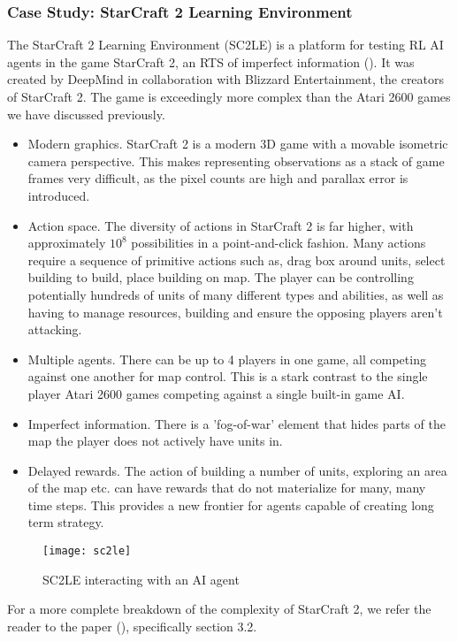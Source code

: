 \subsubsection{Case Study: StarCraft 2 Learning Environment}
The StarCraft 2 Learning Environment (SC2LE) is a platform for testing RL AI agents in the game StarCraft 2, an RTS of imperfect information (\cite{starcraft}). It was created by DeepMind in collaboration with Blizzard Entertainment, the creators of StarCraft 2. The game is exceedingly more complex than the Atari 2600 games we have discussed previously.
\begin{itemize}
    \item Modern graphics. StarCraft 2 is a modern 3D game with a movable isometric camera perspective. This makes representing observations as a stack of game frames very difficult, as the pixel counts are high and parallax error is introduced.
    \item  Action space. The diversity of actions in StarCraft 2 is far higher, with approximately $10^8$ possibilities in a point-and-click fashion. Many actions require a sequence of primitive actions such as, drag box around units, select building to build, place building on map. The player can be controlling potentially hundreds of units of many different types and abilities, as well as having to manage resources, building and ensure the opposing players aren't attacking.
    \item Multiple agents. There can be up to 4 players in one game, all competing against one another for map control. This is a stark contrast to the single player Atari 2600 games competing against a single built-in game AI.
    \item Imperfect information. There is a 'fog-of-war' element that hides parts of the map the player does not actively have units in.
    \item Delayed rewards. The action of building a number of units, exploring an area of the map etc. can have rewards that do not materialize for many, many time steps. This provides a new frontier for agents capable of creating long term strategy.
\end{itemize}

\begin{figure}[H]
    \centering
    \texttt{[image: sc2le]}
    \caption{SC2LE interacting with an AI agent}
\end{figure}

For a more complete breakdown of the complexity of StarCraft 2, we refer the reader to the paper (\cite{starcraft}), specifically section 3.2. \paragraph{}

